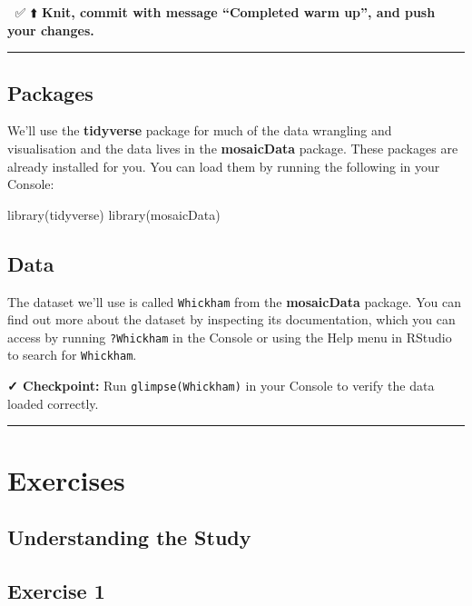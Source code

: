 \documentclass[]{tufte-handout}
\newenvironment{Shaded}{}{}
\newcommand{\FunctionTok}[1]{\textcolor[rgb]{0.02,0.16,0.49}{#1}}
\newcommand{\NormalTok}[1]{#1}
\begin{document}
🧶 ✅ ⬆️ \textbf{Knit, commit with message ``Completed warm up'', and
push your changes.}

\begin{center}\rule{0.5\linewidth}{0.5pt}\end{center}

\subsection{Packages}\label{packages}

We'll use the \textbf{tidyverse} package for much of the data wrangling
and visualisation and the data lives in the \textbf{mosaicData} package.
These packages are already installed for you. You can load them by
running the following in your Console:

\begin{Shaded}
\begin{Highlighting}[]
\FunctionTok{library}\NormalTok{(tidyverse) }
\FunctionTok{library}\NormalTok{(mosaicData) }
\end{Highlighting}
\end{Shaded}

\subsection{Data}\label{data}

The dataset we'll use is called \texttt{Whickham} from the
\textbf{mosaicData} package. You can find out more about the dataset by
inspecting its documentation, which you can access by running
\texttt{?Whickham} in the Console or using the Help menu in RStudio to
search for \texttt{Whickham}.

\textbf{✓ Checkpoint:} Run \texttt{glimpse(Whickham)} in your Console to
verify the data loaded correctly.

\begin{center}\rule{0.5\linewidth}{0.5pt}\end{center}

\section{Exercises}\label{exercises}

\subsection{Understanding the Study}\label{understanding-the-study}

\subsection{Exercise 1}\label{exercise-1}
\end{document}
